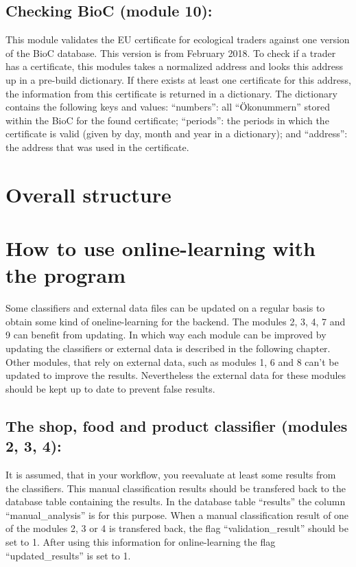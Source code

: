 \documentclass[letterpaper,10pt,english]{sphinxmanual}
\begin{document}
\section{Checking BioC (module 10):}
\label{\detokenize{modules:checking-bioc-module-10}}
This module validates the EU certificate for ecological traders
against one version of the BioC database. This version is from
February 2018. To check if a trader has a certificate, this modules
takes a normalized address and looks this address up in a pre-build
dictionary. If there exists at least one certificate for this address,
the information from this certificate is returned in a dictionary. The
dictionary contains the following keys and values: “numbers”: all
“Ökonummern” stored within the BioC for the found certificate;
“periods”: the periods in which the certificate is valid (given by
day, month and year in a dictionary); and “address”: the address that
was used in the certificate.


\chapter{Overall structure}
\label{\detokenize{overall:overall-structure}}\label{\detokenize{overall::doc}}


\chapter{How to use online-learning with the program}
\label{\detokenize{online_learning:how-to-use-online-learning-with-the-program}}\label{\detokenize{online_learning::doc}}\label{\detokenize{online_learning:online}}
Some classifiers and external data files can be updated on a regular
basis to obtain some kind of oneline-learning for the backend. The
modules 2, 3, 4, 7 and 9 can benefit from updating. In which way each
module can be improved by updating the classifiers or external data is
described in the following chapter. Other modules, that rely on
external data, such as modules 1, 6 and 8 can’t be updated to improve
the results. Nevertheless the external data for these modules should
be kept up to date to prevent false results.


\section{The shop, food and product classifier (modules 2, 3, 4):}
\label{\detokenize{online_learning:the-shop-food-and-product-classifier-modules-2-3-4}}
It is assumed, that in your workflow, you reevaluate at least some
results from the classifiers. This manual classification results
should be transfered back to the database table containing the
results. In the database table “results” the column “manual\_analysis”
is for this purpose. When a manual classification result of one of the
modules 2, 3 or 4 is transfered back, the flag “validation\_result”
should be set to 1. After using this information for online-learning
the flag “updated\_results” is set to 1.
\end{document}
